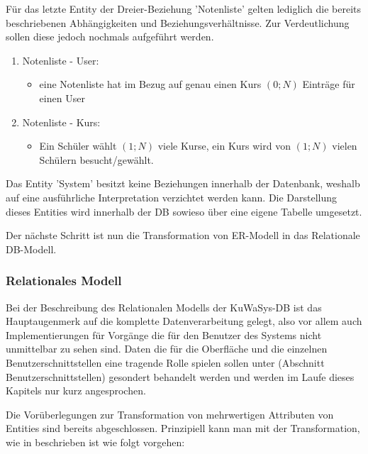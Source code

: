 \documentclass[12pt, twoside, a4paper, ngerman]{article}
\begin{document}
Für das letzte Entity der Dreier-Beziehung 'Notenliste' gelten lediglich die bereits beschriebenen Abhängigkeiten und Beziehungsverhältnisse. 
Zur Verdeutlichung sollen diese jedoch nochmals aufgeführt werden.

\begin{enumerate}
  \item Notenliste - User:
  \begin{itemize}
    \item eine Notenliste hat im Bezug auf genau einen Kurs $(0;N)$ Einträge für einen User
  \end{itemize}
  
  \item Notenliste - Kurs:
  \begin{itemize}
    \item Ein Schüler wählt $(1;N)$ viele Kurse, ein Kurs wird von $(1;N)$ vielen Schülern besucht/gewählt.
  \end{itemize}
  
\end{enumerate}

Das Entity 'System' besitzt keine Beziehungen innerhalb der Datenbank, weshalb auf eine ausführliche Interpretation verzichtet werden kann.
Die Darstellung dieses Entities wird innerhalb der \ac{DB} sowieso über eine eigene Tabelle umgesetzt.

Der nächste Schritt ist nun die Transformation von \ac{ER-Modell} in das Relationale \ac{DB}-Modell.

\subsubsection{Relationales Modell}\label{subsec:RelModell}

Bei der Beschreibung des Relationalen Modells der KuWaSys-\ac{DB} ist das Hauptaugenmerk auf die komplette Datenverarbeitung gelegt, also vor allem auch Implementierungen für Vorgänge die für den Benutzer des Systems nicht unmittelbar zu sehen sind.
Daten die für die Oberfläche und die einzelnen Benutzerschnittstellen eine tragende Rolle spielen sollen unter (Abschnitt Benutzerschnittstellen) gesondert behandelt werden und werden im Laufe dieses Kapitels nur kurz angesprochen.

Die Vorüberlegungen zur Transformation von mehrwertigen Attributen von Entities sind bereits abgeschlossen.
Prinzipiell kann man mit der Transformation, wie in \cite{VossenG-DDD} beschrieben ist wie folgt vorgehen:
\end{document}
